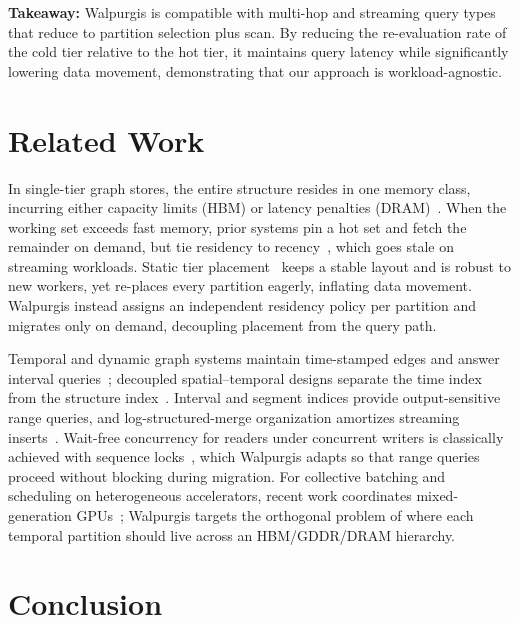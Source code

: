\documentclass{article}
\begin{document}
\textbf{Takeaway:} Walpurgis is compatible with multi-hop and streaming query types that
reduce to partition selection plus scan. By reducing the re-evaluation rate of the cold
tier relative to the hot tier, it maintains query latency while significantly lowering
data movement, demonstrating that our approach is workload-agnostic.

\section{Related Work}
\label{sec:related}

In single-tier graph stores, the entire structure resides in one memory class, incurring
either capacity limits (HBM) or latency penalties (DRAM)~\citep{kipf2017semi}. When the
working set exceeds fast memory, prior systems pin a hot set and fetch the remainder on
demand, but tie residency to recency~\citep{hamilton2017inductive}, which goes stale on
streaming workloads. Static tier placement~\citep{ying2018graph} keeps a stable layout
and is robust to new workers, yet re-places every partition eagerly, inflating data
movement. Walpurgis instead assigns an independent residency policy per partition and
migrates only on demand, decoupling placement from the query path.

Temporal and dynamic graph systems maintain time-stamped edges and answer interval
queries~\citep{rossi2020temporal,wang2021tgl}; decoupled spatial--temporal designs
separate the time index from the structure index~\citep{shao2022decoupled}. Interval and
segment indices provide output-sensitive range queries, and log-structured-merge
organization amortizes streaming inserts~\citep{oneil1996lsm}. Wait-free concurrency for
readers under concurrent writers is classically achieved with sequence
locks~\citep{lamport1987fast}, which Walpurgis adapts so that range queries proceed
without blocking during migration. For collective batching and scheduling on
heterogeneous accelerators, recent work coordinates mixed-generation
GPUs~\citep{jiang2024megascale}; Walpurgis targets the orthogonal problem of where each
temporal partition should live across an HBM/GDDR/DRAM hierarchy.

\section{Conclusion}
\label{sec:conclusion}
\end{document}
